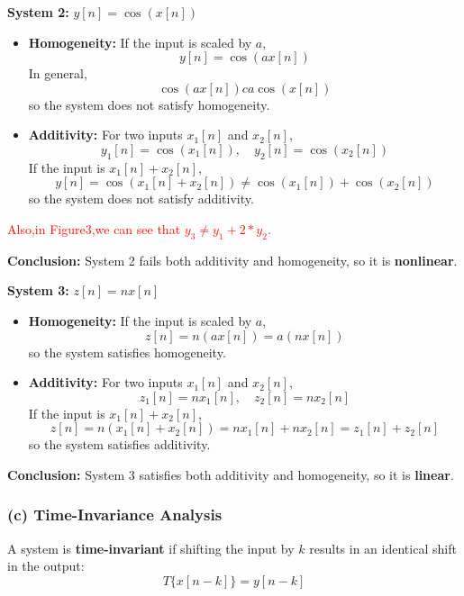 \documentclass[12pt,a4paper,UTF8]{article}
\begin{document}
\vspace{0.5em}

\textbf{System 2:} \( y[n] = \cos(x[n]) \)  
\begin{itemize}
    \item \textbf{Homogeneity:}  
    If the input is scaled by \( a \),  
    \[
    y[n] = \cos(a x[n])
    \]  
    In general,  
    \[
    \cos(a x[n])c a \cos(x[n])
    \]  
    so the system does not satisfy homogeneity.

    \item \textbf{Additivity:}  
    For two inputs \( x_1[n] \) and \( x_2[n] \),  
    \[
    y_1[n] = \cos(x_1[n]), \quad y_2[n] = \cos(x_2[n])
    \]  
    If the input is \( x_1[n] + x_2[n] \),  
    \[
    y[n] = \cos(x_1[n] + x_2[n]) \neq \cos(x_1[n]) + \cos(x_2[n])
    \]  
    so the system does not satisfy additivity.
\end{itemize} 
\textcolor{red}{Also,in Figure3,we can see that $y_3 \neq y_1+2*y_2$.} 

\textbf{Conclusion:} System 2 fails both additivity and homogeneity, so it is \textbf{nonlinear}. \\
\vspace{0.5em}

\textbf{System 3:} \( z[n] = n x[n] \)  
\begin{itemize}
    \item \textbf{Homogeneity:}  
    If the input is scaled by \( a \),  
    \[
    z[n] = n (a x[n]) = a (n x[n])
    \]  
    so the system satisfies homogeneity.

    \item \textbf{Additivity:}  
    For two inputs \( x_1[n] \) and \( x_2[n] \),  
    \[
    z_1[n] = n x_1[n], \quad z_2[n] = n x_2[n]
    \]  
    If the input is \( x_1[n] + x_2[n] \),  
    \[
    z[n] = n (x_1[n] + x_2[n]) = n x_1[n] + n x_2[n] = z_1[n] + z_2[n]
    \]  
    so the system satisfies additivity.
\end{itemize}  
\textbf{Conclusion:} System 3 satisfies both additivity and homogeneity, so it is \textbf{linear}.

\vspace{1em}

\subsubsection*{(c) Time-Invariance Analysis}  
A system is \textbf{time-invariant} if shifting the input by \( k \) results in an identical shift in the output:  
\[
T\{x[n-k]\} = y[n-k]
\]
\end{document}
